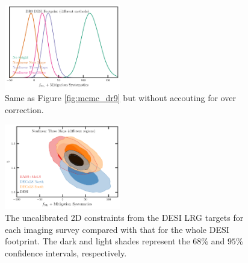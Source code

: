 \begin{figure}
    \centering
    \includegraphics[width=0.45\textwidth]{figures/mcmc_dr9methods1dnoshift.pdf}
    \caption{Same as Figure \ref{fig:mcmc_dr9} but without accouting for over correction. }
    \label{fig:mcmcdr9noshift}
\end{figure}
\begin{figure}
    \centering
    \includegraphics[width=0.45\textwidth]{figures/mcmc_dr9regions.pdf} 
    \caption{The uncalibrated 2D constraints from the DESI LRG targets for each imaging survey compared with that for the whole DESI footprint. The dark and light shades represent the $68\%$ and $95\%$ confidence intervals, respectively. }\label{fig:mcmc_dr9reg}
\end{figure}
